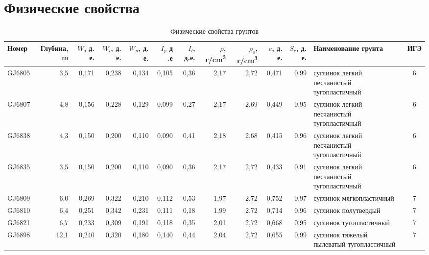 \chapter{Физические свойства}\label{app:phisics}

\begin{sidewaystable}[p]
    \centering
    \tiny
    \caption{Физические свойства грунтов}
    \begin{tabular}{@{}lrrrrrrrrrrlc@{}}
    \hline
    Номер  & Глубина, \si{\meter} & $W$, д. е. & $W_l$, д. е. & $W_p$, д. е. & $I_p$ д .е & $I_l$, д.е. & $\rho$, г/\si{\centi\meter^3} & $\rho_s$, г/\si{\centi\meter^3} & $e$, д. е. & $S_r$, д. е. & Наименование   грунта                        & ИГЭ \\ \hline
    GJ6805          & 3,5        & 0,171                        & 0,238   & 0,134  & 0,105  & 0,36     & 2,17     & 2,72      & 0,471   & 0,99     & суглинок легкий   песчанистый тугопластичный & 6   \\ 
    GJ6807          & 4,8        & 0,156                        & 0,228   & 0,129  & 0,099  & 0,27     & 2,17     & 2,69      & 0,449   & 0,95     & суглинок легкий   песчанистый тугопластичный & 6   \\ 
    GJ6838          & 4,3        & 0,150                        & 0,200   & 0,110  & 0,090  & 0,41     & 2,18     & 2,68      & 0,415   & 0,96     & суглинок легкий   песчанистый тугопластичный & 6   \\
    GJ6835          & 3,5        & 0,150                        & 0,200   & 0,110  & 0,090  & 0,36     & 2,17     & 2,72      & 0,433   & 0,91     & суглинок легкий   песчанистый тугопластичный & 6   \\ 
    GJ6809          & 6,0        & 0,269                        & 0,322   & 0,210  & 0,112  & 0,53     & 1,97     & 2,72      & 0,752   & 0,97     & суглинок   мягкопластичный                   & 7   \\ 
    GJ6810          & 6,4        & 0,251                        & 0,342   & 0,231  & 0,111  & 0,18     & 1,99     & 2,72      & 0,714   & 0,96     & суглинок полутвердый                         & 7   \\ 
    GJ6821          & 6,7        & 0,233                        & 0,309   & 0,191  & 0,118  & 0,35     & 2,01     & 2,72      & 0,668   & 0,95     & суглинок   тугопластичный                    & 7   \\ 
    GJ6898          & 12,1       & 0,240                        & 0,320   & 0,180  & 0,140  & 0,44     & 2,04     & 2,72      & 0,655   & 0,99     & суглинок тяжелый   пылеватый тугопластичный  & 7   \\ 

\end{tabular}
\end{sidewaystable}
